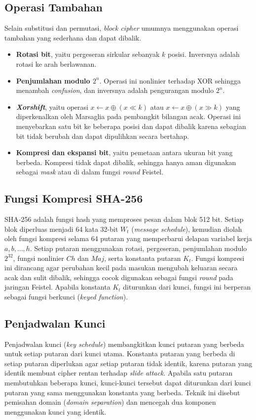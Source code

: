 \subsection{Operasi Tambahan}
Selain substitusi dan permutasi, \textit{block cipher} umumnya menggunakan operasi tambahan yang sederhana dan dapat dibalik.
\begin{itemize}[noitemsep]
    \item \textbf{Rotasi bit}, yaitu pergeseran sirkular sebanyak $k$ posisi. Inversnya adalah rotasi ke arah berlawanan.
    \item \textbf{Penjumlahan modulo $2^n$}. Operasi ini nonlinier terhadap XOR sehingga menambah \textit{confusion}, dan inversnya adalah pengurangan modulo $2^n$.
    \item \textbf{\textit{Xorshift}}, yaitu operasi $x \leftarrow x \oplus (x \ll k)$ atau $x \leftarrow x \oplus (x \gg k)$ yang diperkenalkan oleh Marsaglia pada pembangkit bilangan acak. Operasi ini menyebarkan satu bit ke beberapa posisi dan dapat dibalik karena sebagian bit tidak berubah dan dapat dipulihkan secara bertahap.
    \item \textbf{Kompresi dan ekspansi bit}, yaitu pemetaan antara ukuran bit yang berbeda. Kompresi tidak dapat dibalik, sehingga hanya aman digunakan sebagai \textit{mask} atau di dalam fungsi \textit{round} Feistel.
\end{itemize}

\subsection{Fungsi Kompresi SHA-256}
SHA-256 adalah fungsi hash yang memproses pesan dalam blok 512 bit. Setiap blok diperluas menjadi 64 kata 32-bit $W_t$ (\textit{message schedule}), kemudian diolah oleh fungsi kompresi selama 64 putaran yang memperbarui delapan variabel kerja $a, b, \ldots, h$. Setiap putaran menggunakan rotasi, pergeseran, penjumlahan modulo $2^{32}$, fungsi nonlinier $Ch$ dan $Maj$, serta konstanta putaran $K_t$. Fungsi kompresi ini dirancang agar perubahan kecil pada masukan mengubah keluaran secara acak dan sulit dibalik, sehingga cocok digunakan sebagai fungsi \textit{round} pada jaringan Feistel. Apabila konstanta $K_t$ diturunkan dari kunci, fungsi ini berperan sebagai fungsi berkunci (\textit{keyed function}).

\subsection{Penjadwalan Kunci}
Penjadwalan kunci (\textit{key schedule}) membangkitkan kunci putaran yang berbeda untuk setiap putaran dari kunci utama. Konstanta putaran yang berbeda di setiap putaran diperlukan agar setiap putaran tidak identik, karena putaran yang identik membuat cipher rentan terhadap \textit{slide attack}. Apabila satu putaran membutuhkan beberapa kunci, kunci-kunci tersebut dapat diturunkan dari kunci putaran yang sama menggunakan konstanta yang berbeda. Teknik ini disebut pemisahan domain (\textit{domain separation}) dan mencegah dua komponen menggunakan kunci yang identik.

